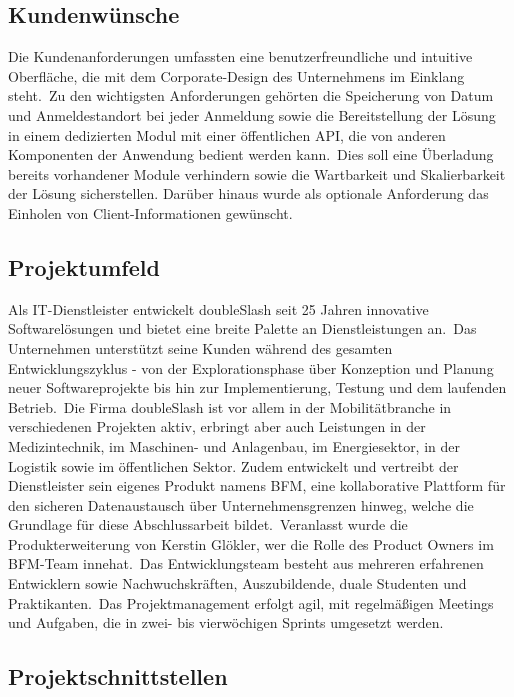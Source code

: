\subsection{Kundenwünsche}
\label{subsec:Kundenwuensche}

Die Kundenanforderungen umfassten eine benutzerfreundliche und intuitive Oberfläche, die mit dem Corporate-Design des Unternehmens im Einklang steht.\
Zu den wichtigsten Anforderungen gehörten die Speicherung von Datum und Anmeldestandort bei jeder Anmeldung sowie die Bereitstellung der Lösung in einem dedizierten Modul mit einer öffentlichen API,
die von anderen Komponenten der Anwendung bedient werden kann.\ Dies soll eine Überladung bereits vorhandener Module verhindern sowie die Wartbarkeit und Skalierbarkeit der Lösung sicherstellen.
Darüber hinaus wurde als optionale Anforderung das Einholen von Client-Informationen gewünscht.

\subsection{Projektumfeld}
\label{subsec:Projektumfeld}

Als IT-Dienstleister entwickelt doubleSlash seit 25 Jahren innovative Softwarelösungen und bietet eine breite Palette an Dienstleistungen an.\ Das Unternehmen unterstützt seine Kunden während des gesamten
Entwicklungszyklus - von der Explorationsphase über Konzeption und Planung neuer Softwareprojekte bis hin zur Implementierung, Testung und dem laufenden Betrieb.\ Die Firma doubleSlash ist vor allem in der Mobilitätbranche
in verschiedenen Projekten aktiv, erbringt aber auch Leistungen in der Medizintechnik, im Maschinen- und Anlagenbau, im Energiesektor, in der Logistik sowie im öffentlichen Sektor.
Zudem entwickelt und vertreibt der Dienstleister sein eigenes Produkt namens BFM, eine kollaborative Plattform für den sicheren Datenaustausch über Unternehmensgrenzen hinweg, welche die Grundlage für diese Abschlussarbeit
bildet.\ Veranlasst wurde die Produkterweiterung von Kerstin Glökler, wer die Rolle des Product Owners im BFM-Team innehat.\ Das Entwicklungsteam besteht aus mehreren erfahrenen Entwicklern sowie Nachwuchskräften, \ua Auszubildende, duale Studenten
und Praktikanten.\ Das Projektmanagement erfolgt agil, mit regelmäßigen Meetings und Aufgaben, die in zwei- bis vierwöchigen Sprints umgesetzt werden.

\subsection{Projektschnittstellen} 
\label{subsec:Projektschnittstellen}

